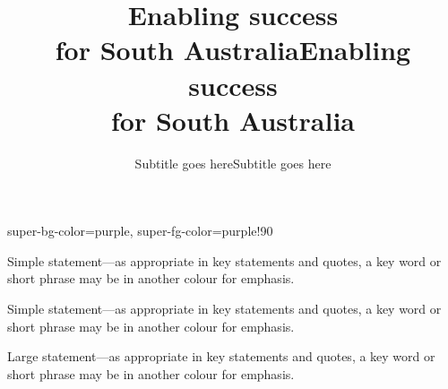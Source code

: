 \documentclass{ltx-talk-au}
\begin{document}
\begin{frame}[design=cover-super, tag-slides=0]
  \title{Enabling success\\ for South Australia}
  \subtitle{Subtitle goes here}
  \maketitle
\end{frame}

\begingroup
{}
  {super-bg-color=purple, super-fg-color=purple!90}
\begin{frame}[design=cover-super, tag-slides=0, theme=darkblue]
  \title{Enabling success\\ for South Australia}
  \subtitle{Subtitle goes here}
  \maketitle
\end{frame}
\endgroup

\begin{frame}
  \thispagestyle{plain}
\end{frame}

\TalkAUAcknowledgementCountry

\tableofcontents

\begin{frame}[design=statement-image]

  Simple statement—as appropriate in key statements and quotes, a key word or
  short phrase may be in another colour for \alert{emphasis}.
\end{frame}

\begin{frame}[design=statement-image, theme=limestone]

  Simple statement—as appropriate in key statements and quotes, a key word or
  short phrase may be in another colour for \alert{emphasis}.
\end{frame}

\begin{frame}[design=statement, theme=darkblue]
  Large statement—as appropriate in key statements and quotes, a key word or
  short phrase may be in another colour for \alert{emphasis}.
\end{frame}
\end{document}
